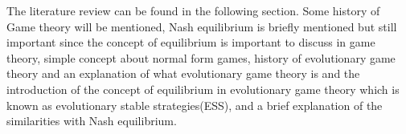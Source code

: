 \documentclass{book}
\begin{document}
\newpage
{}
\maketitle


The literature review can be found in the following section. Some history of Game theory will be mentioned, Nash equilibrium is briefly mentioned but still important since the concept of equilibrium is important to discuss in game theory, simple concept about normal form games, history of evolutionary game theory and an explanation of what evolutionary game theory is and the introduction of the concept of equilibrium in evolutionary game theory which is known as evolutionary stable strategies(ESS), and a brief explanation of the similarities with Nash equilibrium.



\newpage
\end{document}
